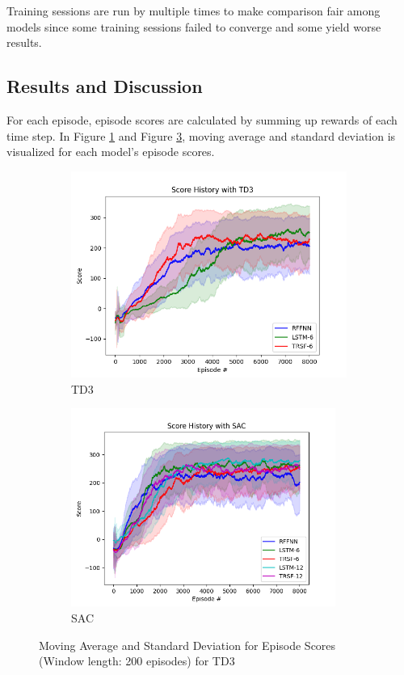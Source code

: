 \documentclass[a4paper, 12pt]{article} %
\begin{document}
Training sessions are run by multiple times to make comparison fair among models since some training sessions failed to converge and some yield worse results.

\subsection{Results and Discussion}

For each episode, episode scores are calculated by summing up rewards of each time step. 
In Figure \ref{fig:td3_std_ep_rewards} and Figure \ref{fig:sac_std_ep_rewards}, moving average and standard deviation is visualized for each model's episode scores. 

\begin{figure}[!ht]
	\centering
	\begin{subfigure}{.49\textwidth}
		\centering
		\includegraphics[width=0.99\textwidth]{figures/bipedal/STD_TD3_RFFNN_LSTM-6_TRSF-6.png}
		\caption{TD3}
		\label{fig:td3_std_ep_rewards}
	\end{subfigure}
	\begin{subfigure}{.49\textwidth}
		\centering
		\includegraphics[width=0.95\textwidth]{figures/bipedal/STD_SAC_RFFNN_LSTM-6_TRSF-6_LSTM-12_TRSF-12.png}
		\caption{SAC}
		\label{fig:sac_std_ep_rewards}
	\end{subfigure}
	\caption{Moving Average and Standard Deviation for Episode Scores (Window length: 200 episodes) for TD3}
\end{figure}
\end{document}
